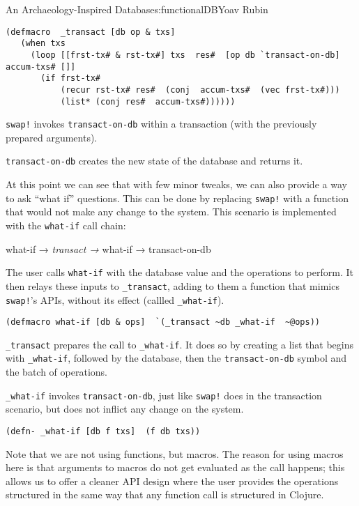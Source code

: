\begin{aosachapter}{An Archaeology-Inspired Database}{s:functionalDB}{Yoav Rubin}
\begin{aosaitemize}
\begin{verbatim}
(defmacro  _transact [db op & txs]
   (when txs
     (loop [[frst-tx# & rst-tx#] txs  res#  [op db `transact-on-db]  accum-txs# []]
       (if frst-tx#
           (recur rst-tx# res#  (conj  accum-txs#  (vec frst-tx#)))
           (list* (conj res#  accum-txs#))))))
\end{verbatim}
\item
  \texttt{swap!} invokes \texttt{transact-on-db} within a transaction
  (with the previously prepared arguments).
\item
  \texttt{transact-on-db} creates the new state of the database and
  returns it.
\end{aosaitemize}

At this point we can see that with few minor tweaks, we can also provide
a way to ask ``what if'' questions. This can be done by replacing
\texttt{swap!} with a function that would not make any change to the
system. This scenario is implemented with the \texttt{what-if} call
chain:

what-if → \emph{transact → }what-if → transact-on-db

\begin{aosaitemize}
\item
  The user calls \texttt{what-if} with the database value and the
  operations to perform. It then relays these inputs to
  \texttt{\_transact}, adding to them a function that mimics
  \texttt{swap!}'s APIs, without its effect (callled
  \texttt{\_what-if}).

\begin{verbatim}
(defmacro what-if [db & ops]  `(_transact ~db _what-if  ~@ops))
\end{verbatim}
\item
  \texttt{\_transact} prepares the call to \texttt{\_what-if}. It does
  so by creating a list that begins with \texttt{\_what-if}, followed by
  the database, then the \texttt{transact-on-db} symbol and the batch of
  operations.
\item
  \texttt{\_what-if} invokes \texttt{transact-on-db}, just like
  \texttt{swap!} does in the transaction scenario, but does not inflict
  any change on the system.
\end{aosaitemize}

\begin{verbatim}
(defn- _what-if [db f txs]  (f db txs))
\end{verbatim}

Note that we are not using functions, but macros. The reason for using
macros here is that arguments to macros do not get evaluated as the call
happens; this allows us to offer a cleaner API design where the user
provides the operations structured in the same way that any function
call is structured in Clojure.


\end{aosachapter}
